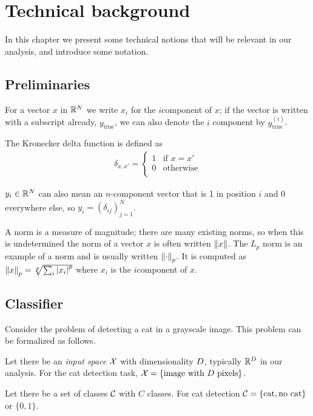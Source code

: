 \documentclass[../main.tex]{subfiles}
\begin{document}
\chapter{Technical background}
\label{ch:background}

In this chapter we present some technical notions that will be relevant in our analysis, and introduce some notation.

\section{Preliminaries}

For a vector $x$ in $\mathbb{R}^N$ we write $x_i$ for the $i$\nth component of $x$; if the vector is written with a subscript already, \eg{} $y_\text{true}$, we can also denote the $i$\nth{} component by $y^{(i)}_\text{true}$.

The Kronecker delta function is defined as
\begin{align*}
\delta_{x, x'} = \begin{cases}
    1 & \text{if } x = x' \\
    0 & \text{otherwise} \\
\end{cases}
\end{align*}

$y_i \in \mathbb{R}^N$ can also mean an $n$-component vector that is 1 in position $i$ and 0 everywhere else, so $y_i = (\delta_{ij})_{j=1}^N$.

A norm is a measure of magnitude; there are many existing norms, so when this is undetermined the norm of a vector $x$ is often written $\left\lVert x\right\rVert$.
The $L_p$ norm is an example of a norm and is usually written $\left\lVert\cdot\right\rVert_p$.
It is computed as $\left\lVert x\right\rVert_p = \sqrt[p]{\sum_i \left\lvert x_i\right\rvert^p}$ where $x_i$ is the $i$\nth component of $x$.

\section{Classifier}

Consider the problem of detecting a cat in a grayscale image. This problem can be formalized as follows.

Let there be an \emph{input space} $\mathcal{X}$ with dimensionality $D$, typically $\mathbb{R}^D$ in our analysis.
For the cat detection task, $\mathcal{X} = \{\text{image with $D$ pixels}\}$.

Let there be a set of classes $\mathcal{C}$ with $C$ classes. For cat detection $\mathcal{C} = \{\text{cat}, \text{no cat}\}$ or $\{0, 1\}$.
\end{document}
